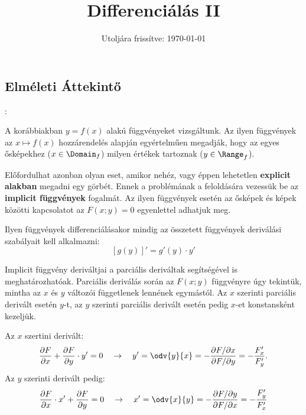 \documentclass[a4paper, 12pt]{scrartcl}
\title{Differenciálás II}
\date{Utoljára frissítve: \today}
\begin{document}
\maketitle

\subsection{Elméleti Áttekintő}

\begin{blueBox}
  :

  A korábbiakban $y = f(x)$ alakú függvényeket vizsgáltunk. Az ilyen függvények
  az $x \mapsto f(x)$ hozzárendelés alapján egyértelműen megadják, hogy az egyes
  ősképekhez ($x \in \Domain_f$) milyen értékek tartoznak ($y \in \Range_f$).

  Előfordulhat azonban olyan eset, amikor nehéz, vagy éppen lehetetlen
  \textbf{explicit alakban} megadni egy görbét. Ennek a problémának a
  feloldására vezessük be az \textbf{implicit függvények} fogalmát. Az ilyen
  függvények esetén az ősképek és képek közötti kapcsolatot az $F(x; y) = 0$
  egyenlettel adhatjuk meg.

  Ilyen függvények differenciálásakor mindig az összetett függvények deriválási
  szabályait kell alkalmazni:
  \[
    \left[ g(y) \right]' = g'(y) \cdot y'
  \]
\end{blueBox}

\begin{note}
  Implicit függvény deriváltjai a parciális deriváltak segítségével is
  meghatározhatóak. Parciális deriválás során az $F(x;y)$ függvényre úgy
  tekintük, mintha az $x$ és $y$ változói függetlenek lennének egymástól. Az
  $x$ szerinti parciális derivált esetén $y$-t, az $y$ szerinti parciális
  derivált esetén pedig $x$-et konstansként kezeljük.

  Az $x$ szertini derivált:
  \[
    \frac{\partial F}{\partial x} + \frac{\partial F}{\partial y} \cdot y' = 0
    \quad \rightarrow \quad
    y'
    = \odv{y}{x}
    = -\frac{\partial F / \partial x}{\partial F / \partial y}
    = -\frac{F'_x}{F'_y}
    \text.
  \]
  Az $y$ szerinti derivált pedig:
  \[
    \frac{\partial F}{\partial x} \cdot x' + \frac{\partial F}{\partial y} = 0
    \quad \rightarrow \quad
    x'
    = \odv{x}{y}
    = -\frac{\partial F / \partial y}{\partial F / \partial x}
    = -\frac{F'_y}{F'_x}
  \]
\end{note}
\end{document}
